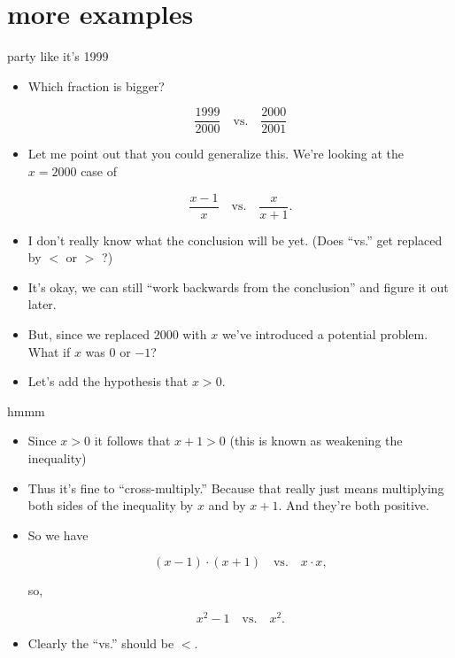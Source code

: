 \documentclass[landscape]{beamer}
\begin{document}
\section{more examples}

\begin{frame}{party like it's 1999}
\begin{itemize}
\item Which fraction is bigger? \pause

\[ \frac{1999}{2000} \quad \mbox{vs.} \quad \frac{2000}{2001} \] \pause

\item Let me point out that you could generalize this.  We're looking at the $x=2000$ case of 

\[ \frac{x-1}{x} \quad \mbox{vs.} \quad \frac{x}{x+1}. \] \pause

\item I don't really know what the conclusion will be yet. \pause (Does ``vs.'' get replaced by $<$ or $>$ ?) \pause
\item It's okay, we can still ``work backwards from the conclusion'' and figure it out later. \pause
\item But, since we replaced $2000$ with $x$ we've introduced a potential problem. \pause What if $x$ was $0$ or $-1$? \pause
\item Let's add the hypothesis that $x>0$.

\end{itemize}
\end{frame}

\begin{frame}{hmmm\textellipsis}
\begin{itemize}
\item Since $x>0$ it follows that $x+1>0$ \pause (this is known as weakening the inequality) \pause
\item Thus it's fine to ``cross-multiply.'' \pause \newline
Because that really just means multiplying both sides of the inequality by $x$ and by $x+1$. \pause \newline
And they're both positive. \pause
\item So we have 

\[ (x-1)\cdot(x+1) \quad \mbox{vs.} \quad x\cdot x, \] 

\pause

\noindent so, 

\[ x^2-1 \quad \mbox{vs.} \quad x^2.  \] 
\pause

\item Clearly the ``vs.'' should be $<$.
\end{itemize}
\end{frame}
\end{document}
